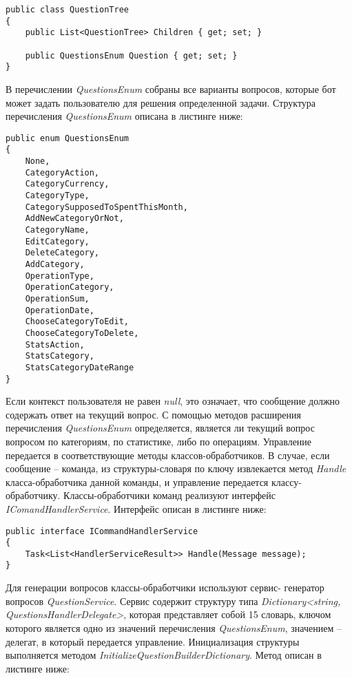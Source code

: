 \lstset{style=sharpc}
\begin{lstlisting}
public class QuestionTree
{
	public List<QuestionTree> Children { get; set; }

	public QuestionsEnum Question { get; set; }
}
\end{lstlisting}

В перечислении \emph{QuestionsEnum} собраны все варианты вопросов, которые бот может задать пользователю для решения определенной задачи. Структура перечисления \emph{QuestionsEnum} описана в листинге ниже:

\lstset{style=sharpc}
\begin{lstlisting}
public enum QuestionsEnum
{
	None,
	CategoryAction,
	CategoryCurrency,
	CategoryType,
	CategorySupposedToSpentThisMonth,
	AddNewCategoryOrNot,
	CategoryName,
	EditCategory,
	DeleteCategory,
	AddCategory,
	OperationType,
	OperationCategory,
	OperationSum,
	OperationDate,
	ChooseCategoryToEdit,
	ChooseCategoryToDelete,
	StatsAction,
	StatsCategory,
	StatsCategoryDateRange
}
\end{lstlisting}

Если контекст пользователя не равен \emph{null}, это означает, что сообщение должно содержать ответ на текущий вопрос. С помощью методов расширения перечисления \emph{QuestionsEnum} определяется, является ли текущий вопрос вопросом по категориям, по статистике, либо по операциям. Управление передается в соответствующие методы классов-обработчиков.
В случае, если сообщение – команда, из структуры-словаря по ключу извлекается метод \emph{Handle} класса-обработчика данной команды, и управление передается классу-обработчику.
Классы-обработчики команд реализуют интерфейс \emph{IComandHandlerService}. Интерфейс описан в листинге ниже:

\lstset{style=sharpc}
\begin{lstlisting}
public interface ICommandHandlerService
{
	Task<List<HandlerServiceResult>> Handle(Message message);
}
\end{lstlisting}

Для генерации вопросов классы-обработчики используют сервис- \linebreak генератор вопросов \emph{QuestionService}. Сервис содержит структуру типа \linebreak \emph{Dictionary<string, QuestionsHandlerDelegate>}, которая представляет собой
15
словарь, ключом которого является одно из значений перечисления \linebreak \emph{QuestionsEnum}, значением – делегат, в который передается управление.
Инициализация структуры выполняется методом \linebreak \emph{InitializeQuestionBuilderDictionary}. Метод описан в листинге ниже:


